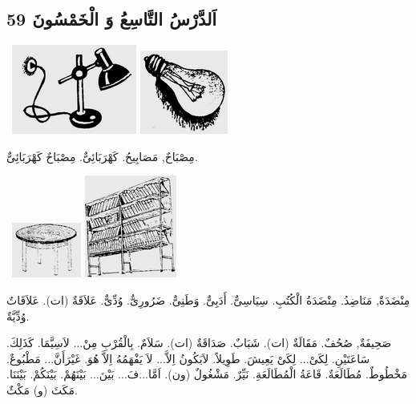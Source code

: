 \documentclass[a5paper]{article}
\begin{document}
\subsection{اَلدَّرْسُ التَّاسِعُ وَ الْخَمْسُونَ 59}
\  \includegraphics[width=1.6146in,height=1.1563in]{MuhammadBagauddinlatinized-img192.png}   \includegraphics[width=1.1354in,height=1.0835in]{MuhammadBagauddinlatinized-img193.png} 

مِصْبَاحٌ, مَصَابِيحُ. كَهْرَبَائِىٌّ. مِصْبَاحٌ كَهْرَبَائِىٌّ. 

\  \includegraphics[width=0.8957in,height=0.7083in]{MuhammadBagauddinlatinized-img194.png}   \includegraphics[width=1.1874in,height=1.3228in]{MuhammadBagauddinlatinized-img195.png} 

مِنْضَدَةٌ, مَنَاضِدُ. مِنْضَدَةُ الْكُتُبِ. سِيَاسِىٌّ. أَدَبِىٌّ. وَطَنِىٌّ. ضَرُورِىٌّ. وُدِّىٌّ. عَلاَقَةٌ (ات). عَلاَقَاتٌ وُدِّيَّةٌ. 

صَحِيفَةٌ, صُحُفٌ. مَقَالَةٌ (ات). شَبَابٌ. صَدَاقَةٌ (ات). سَلاَمٌ. بِالْقُرْبِ مِنْ... لاَسِيَّمَا. كَذَلِكَ. سَاعَتَيْنِ. لِكَىْ... لِكَىْ يَعِيشَ. طَوِيلاً. لاَيَكُونُ اِلاَّ... لاَ يَفْهَمُهُ اِلاَّ هُوَ. غَيْرَأَنَّ... مَطْبُوعٌ. مَخْطُوطٌ. مُطَالَعَةٌ. قَاعَةُ الْمُطَالَعَةِ. نَيِّرٌ. مَشْغُولٌ (ون). اَمَّا...فَ... بَيْنَ... بَيْنَهُمْ. بَيْنَكُمْ. بَيْنَنَا. مَكَثَ (و) مَكْثٌ.
\end{document}

